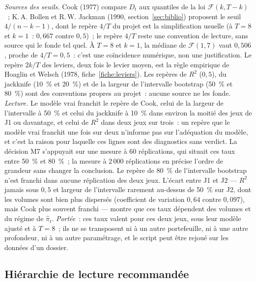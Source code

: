 \documentclass[a4paper,11pt]{article}
\begin{document}
\noindent
\emph{Sources des seuils.} Cook (1977) compare $D_t$ aux quantiles de la loi $\mathcal{F}(k, T-k)$~;
K.\,A. Bollen et R.\,W. Jackman (1990, section~\ref{sec:biblio}) proposent le seuil $4/(n-k-1)$,
dont le repère $4/T$ du projet est la simplification usuelle (à $T = 8$ et $k = 1$~: $0{,}667$
contre $0{,}5$)~; le repère $4/T$ reste une convention de lecture, sans source qui le fonde tel
quel. À $T = 8$ et $k = 1$, la médiane de $\mathcal{F}(1, 7)$ vaut $0{,}506$, proche de $4/T = 0{,}5$~: c'est
une coïncidence numérique, non une justification. Le repère $2k/T$ des leviers, deux fois le levier
moyen, est la règle empirique de Hoaglin et Welsch (1978, fiche~\ref{fiche:leviers}). Les repères
de $R^2$ ($0{,}5$), du jackknife (10~\% et 20~\%) et de la largeur de l'intervalle bootstrap
(50~\% et 80~\%) sont des conventions propres au projet~: aucune source ne les fonde.
\emph{Lecture.} Le modèle vrai franchit le repère de Cook, celui de la largeur de l'intervalle à
50~\% et celui du jackknife à 10~\% dans environ la moitié des jeux de J1 ou davantage, et celui
de $R^2$ dans deux jeux sur trois~: un repère que le modèle vrai franchit une fois sur deux
n'informe pas sur l'adéquation du modèle, et c'est la raison pour laquelle ces lignes sont des
diagnostics sans verdict. La décision M7 s'appuyait sur une mesure à 60 réplications, qui situait
ces taux entre 50~\% et 80~\%~; la mesure à 2\,000 réplications en précise l'ordre de grandeur
sans changer la conclusion. Le repère de 80~\% de l'intervalle bootstrap n'est franchi dans
aucune réplication des deux jeux. L'écart entre J1 et J2 --- $R^2$ jamais sous $0{,}5$ et largeur
de l'intervalle rarement au-dessus de 50~\% sur J2, dont les volumes sont bien plus dispersés
(coefficient de variation $0{,}64$ contre $0{,}097$), mais Cook plus souvent franchi --- montre que ces taux dépendent des volumes et du régime de
$\hat\pi_t$. \emph{Portée}~: ces taux valent pour ces deux jeux, sous leur modèle ajusté et à
$T = 8$~; ils ne se transposent ni à un autre portefeuille, ni à une autre profondeur, ni à un
autre paramétrage, et le script peut être rejoué sur les données d'un dossier.

\subsection*{Hiérarchie de lecture recommandée}
\end{document}
